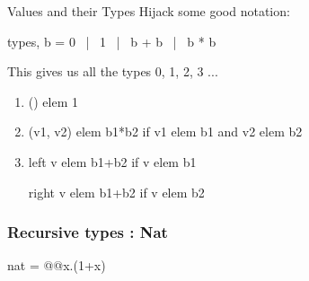 \documentclass[svgnames,11pt]{beamer}
\begin{document}
\begin{frame}[fragile]{Values and their Types}
Hijack some good notation:

\vfill
\begin{block}

  {{ types, b = 0 ~|~ 1 ~|~ b + b ~|~ b * b }}

\end{block}

\vfill
This gives us all the types 0, 1, 2, 3 ... 

\vfill
\pause

\begin{enumerate}
\item 
{{() elem 1}}

\vfill
\pause
\item 
{{(v1, v2) elem b1*b2}} \pause if {{v1 elem b1}} and {{v2 elem b2}}

\vfill
\pause
\item 
{{left v elem b1+b2}} if {{v elem b1}}

{{right v elem b1+b2}} if {{v elem b2}}

\end{enumerate}

\pause

%
%
%



\end{frame}



\begin{frame}
\frametitle{ Recursive types : Nat }


\begin{block}

  \begin{center}
    {{nat = @@x.(1+x)}}

  \end{center}

\end{block}


\end{frame}
\end{document}
